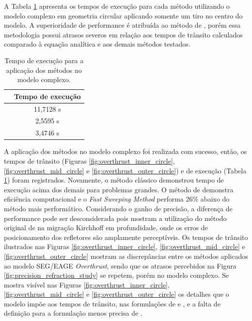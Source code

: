 A Tabela \ref{table_overthrust} apresenta os tempos de execução para cada método utilizando o modelo complexo em geometria circular aplicando somente um tiro no centro do modelo. A superioridade de performance é atribuída ao método de , porém essa metodologia possui atrasos severos em relação aos tempos de trânsito calculados comparado à equação analítica e aos demais métodos testados.

\begin{table}[H]
	\caption{Tempo de execução para a aplicação dos métodos no modelo complexo.}
	\begin{tabular}{r|c}
		& Tempo de execução \\ \hline
		\citeonline{podvin1991finite} & 11,7128 s  \\ \hline
		\citeonline{jeong2008fast} & 2,5595 s      \\ \hline
		\citeonline{noble2014accurate} & 3,4746 s         
	\end{tabular}
	\label{table_overthrust}
\end{table}

A aplicação dos métodos no modelo complexo foi realizada com sucesso, então, os tempos de trânsito (Figuras \ref{fig:overthrust_inner_circle}, \ref{fig:overthrust_mid_circle} e \ref{fig:overthrust_outer_circle}) e de execução (Tabela \ref{table_overthrust}) foram registrados. Novamente, o método clássico demonstrou tempo de execução acima dos demais para problemas grandes. O método de  demonstra eficiência computacional e o \textit{Fast Sweeping Method} performa 26$\%$ abaixo do método mais performático. Considerando o ganho de precisão, a diferença de performance pode ser desconsiderada pois  mostram a utilização do método original de  na migração Kirchhoff em profundidade, onde os erros de posicionamento dos refletores são amplamente perceptíveis. Os tempos de trânsito ilustrados nas Figuras \ref{fig:overthrust_inner_circle}, \ref{fig:overthrust_mid_circle} e \ref{fig:overthrust_outer_circle} mostram as discrepâncias entre os métodos aplicados ao modelo SEG/EAGE \textit{Overthrust}, sendo que os atrasos percebidos na Figura \ref{fig:precision_refraction_study} se repetem, porém no modelo complexo. Se mostra visível nas Figuras \ref{fig:overthrust_inner_circle}, \ref{fig:overthrust_mid_circle} e \ref{fig:overthrust_outer_circle} os detalhes que o modelo impõe aos tempos de trânsito, nas formulações de  e , e a falta de definição para a formulação menos precisa de .  





